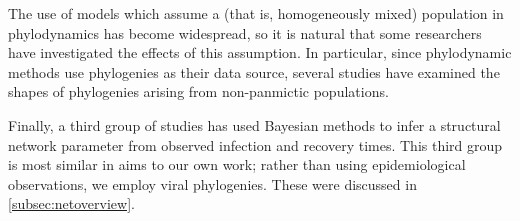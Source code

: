 The use of models which assume a  (that is, homogeneously
mixed) population in phylodynamics has become widespread, so it is natural that
some researchers have investigated the effects of this assumption. In
particular, since phylodynamic methods use phylogenies as their data source,
several studies have examined the shapes of phylogenies arising from
non-panmictic populations.

Finally, a third group of studies has used Bayesian methods to infer a
structural network parameter from observed infection and recovery times. This
third group is most similar in aims to our own work; rather than using
epidemiological observations, we employ viral phylogenies. These were discussed
in \cref{subsec:netoverview}.
